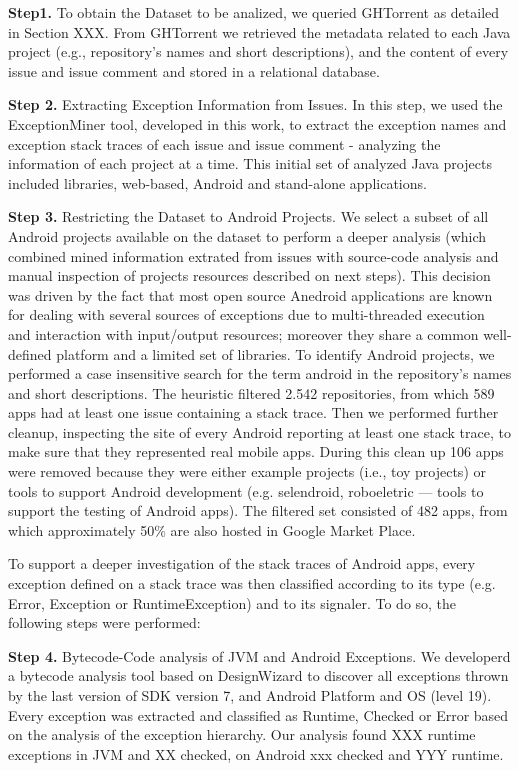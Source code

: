 \documentclass[conference]{IEEEtran}
\begin{document}
\textbf{Step1.} To obtain the Dataset to be analized, we queried GHTorrent as detailed in Section XXX. From GHTorrent we retrieved the metadata related to each Java project (e.g., 
repository's names and short descriptions), and the content of every issue and issue comment 
and stored in a relational database.

\textbf{Step 2.} Extracting Exception Information from Issues. In this step, we used the ExceptionMiner tool,
 developed in this work, to extract the exception names and exception stack traces of each
 issue and issue comment - analyzing the information of each project at a time. This initial 
set of analyzed Java projects included libraries, web-based, Android and stand-alone applications.  

\textbf{Step 3.} Restricting the Dataset to Android Projects. We select a subset of all Android 
projects available on the dataset to perform a deeper analysis (which combined mined
 information extrated from issues with source-code analysis and manual inspection 
of projects resources described on next steps). This decision was driven by the
fact that most open source Anedroid applications are known for dealing
with several sources of exceptions due to multi-threaded execution and
interaction with input/output resources; moreover they share a common
well-defined platform and a limited set of libraries.
To identify Android projects, we performed a case insensitive search for 
the term \textsf{android} in the repository's names and short descriptions.  The
heuristic filtered 2.542 repositories, from which 589 apps had at least one
issue containing a stack trace. Then we performed further cleanup, inspecting the site of every Android
reporting at least one stack trace, to make sure that they represented real
mobile apps. During this clean up 106 apps were removed because they were either
example projects (i.e., toy projects) or tools to support Android development
(e.g. \textsf{selendroid}, \textsf{roboeletric} --- tools to support the testing of Android apps).
The filtered set consisted of 482 apps, from which approximately 50\% are also
hosted in Google Market Place. 

To support a deeper investigation of the stack traces of Android apps, every
exception defined on a stack trace was then classified according to its type
(e.g. Error, Exception or RuntimeException) and to its signaler. To do so, the following 
steps were performed:

\textbf{Step 4.}  Bytecode-Code analysis of JVM and Android Exceptions. We developerd a bytecode analysis tool based on DesignWizard to discover all exceptions thrown by the last version of SDK version 7, and Android Platform and OS (level 19). Every exception was extracted and classified as Runtime, Checked or Error based on the analysis of the exception hierarchy. Our analysis found XXX runtime exceptions in JVM and XX checked, on Android xxx checked and YYY runtime.
\end{document}
